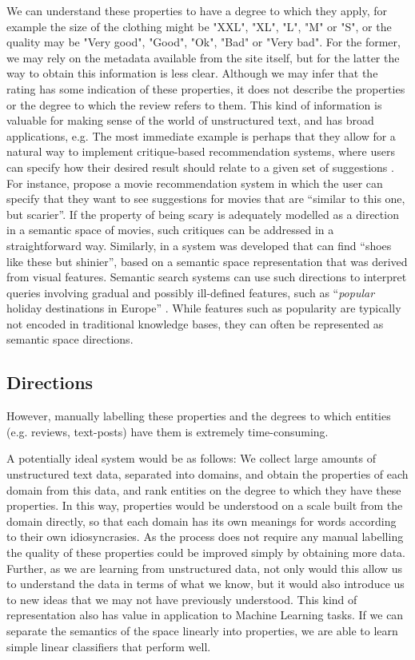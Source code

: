 We can understand these properties to have a degree to which they apply, for example the size of the clothing might be "XXL", "XL", "L", "M" or "S", or the quality may be "Very good", "Good", "Ok", "Bad" or "Very bad". For the former, we may rely on the metadata available from the site itself, but for the latter the way to obtain this information is less clear. Although we may infer that the rating has some indication of these properties, it does not describe the properties or the degree to which the review refers to them. This kind of information is valuable for making sense of the world of unstructured text, and has broad applications, e.g. The most immediate example is perhaps that they allow for a natural way to implement critique-based recommendation systems, where users can specify how their desired result should relate to a given set of suggestions \cite{viappiani2006preference}. For instance, \cite{Vig:2012:TGE:2362394.2362395} propose a movie recommendation system in which the user can specify that they want to see suggestions for movies that are ``similar to this one, but scarier''. If the property of being scary is adequately modelled as a direction in a semantic space of movies, such critiques can be addressed in a straightforward way. Similarly, in \cite{kovashka2012whittlesearch} a system was developed that can find ``shoes like these but shinier'', based on a semantic space representation that was derived from visual features. Semantic search systems can use such directions to interpret queries involving gradual and possibly ill-defined features, such as ``\emph{popular} holiday destinations in Europe'' \cite{DBLP:conf/sigir/JameelBS17}. While features such as popularity are typically not encoded in traditional knowledge bases, they can often be represented as semantic space directions.  %

\subsection{Directions}\label{intro:directions}


However, manually labelling these properties and the degrees to which entities (e.g. reviews, text-posts) have them is extremely time-consuming. 

A potentially ideal system would be as follows: We collect large amounts of unstructured text data, separated into domains, and obtain the properties of each domain from this data, and rank entities on the degree to which they have these properties. In this way, properties would be understood on a scale built from the domain directly, so that each domain has its own meanings for words according to their own idiosyncrasies. As the process does not require any manual labelling the quality of these properties could be improved simply by obtaining more data. Further, as we are learning from unstructured data, not only would this allow us to understand the data in terms of what we know, but it would also introduce us to new ideas that we may not have previously understood. This kind of representation also has value in application to Machine Learning tasks. If we can separate the semantics of the space linearly into properties, we are able to learn simple linear classifiers that perform well. 

